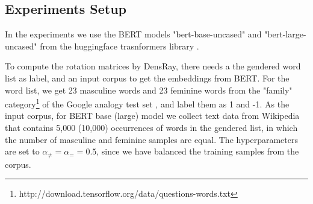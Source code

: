\subsection{Experiments Setup}
In the experiments we use the BERT models "bert-base-uncased" and "bert-large-uncased" from the huggingface trasnformers library \citep{wolf2019huggingfaces}.

To compute the rotation matrices by DensRay, there needs a the gendered word list as label, and an input corpus to get the embeddings from BERT. For the word list, we get 23 masculine words and 23 feminine words from the "family" category\footnote{http://download.tensorflow.org/data/questions-words.txt} of the Google analogy test set \citep{mikolov2013efficient}, and label them as 1 and -1. As the input corpus,  for BERT base (large) model we collect text data from Wikipedia that contains 5,000 (10,000) occurrences of words in the gendered list, in which  the number of masculine and feminine samples are equal. The hyperparameters are set to $\alpha_{\neq}=\alpha_{=}=0.5$, since we have balanced the training samples from the corpus.

